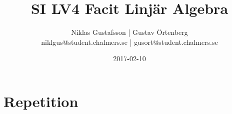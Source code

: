 \documentclass{article}
\title{SI LV4 Facit Linjär Algebra}
\author{Niklas Gustafsson | Gustav Örtenberg  \\ \small{niklgus@student.chalmers.se} | \small{gusort@student.chalmers.se}}
\date{2017-02-10}
\begin{document}
\maketitle
\section*{Repetition}


\section{}


\section{}


\section{}


\section{}


\section{}


\section{}


\section{}

\end{document}

